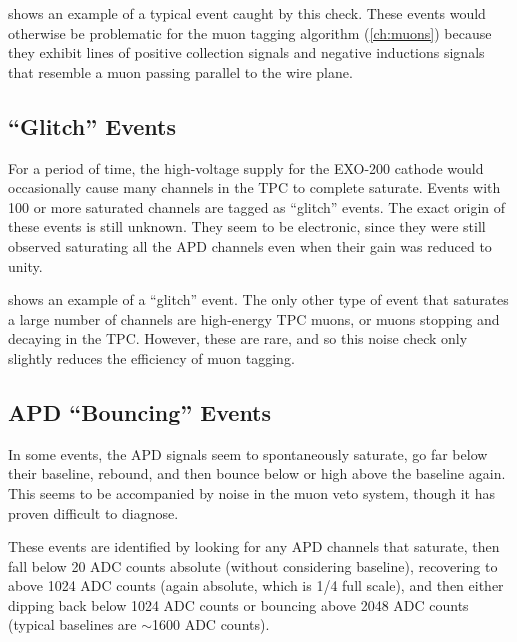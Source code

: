 \documentclass[herrin-thesis.tex]{subfiles}
\begin{document}
 shows an example of a typical event caught by this check. These events would otherwise be problematic for the muon tagging algorithm (\cref{ch:muons}) because they exhibit lines of positive collection signals and negative inductions signals that resemble a muon passing parallel to the wire plane.

\subsection{``Glitch'' Events}
For a period of time, the high-voltage supply for the EXO-200 cathode would occasionally cause many channels in the TPC to complete saturate. Events with 100 or more saturated channels are tagged as ``glitch'' events. The exact origin of these events is still unknown. They seem to be electronic, since they were still observed saturating all the APD channels even when their gain was reduced to unity.

 shows an example of a ``glitch'' event. The only other type of event that saturates a large number of channels are high-energy TPC muons, or  muons stopping and decaying in the TPC. However, these are rare, and so this noise check only slightly reduces the efficiency of muon tagging.

\subsection{APD ``Bouncing'' Events}
In some events, the APD signals seem to spontaneously saturate, go far below their baseline, rebound, and then bounce below or high above the baseline again. This seems to be accompanied by noise in the muon veto system, though it has proven difficult to diagnose.

These events are identified by looking for any APD channels that saturate, then fall below 20 ADC counts absolute (without considering baseline), recovering to above 1024 ADC counts (again absolute, which is 1/4 full scale), and then either dipping back below 1024 ADC counts or bouncing above 2048 ADC counts (typical baselines are \(\sim\)1600 ADC counts). 
\end{document}
